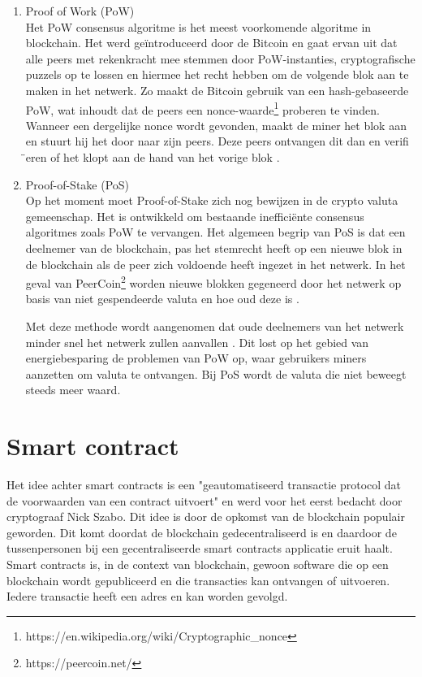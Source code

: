 \begin{enumerate}
	\item Proof of Work (PoW)\\
	Het PoW consensus algoritme is het meest voorkomende algoritme in blockchain. Het werd geïntroduceerd door de Bitcoin en gaat ervan uit dat alle peers met rekenkracht mee stemmen door PoW-instanties, cryptografische puzzels op te lossen en hiermee het recht hebben om de volgende blok aan te maken in het netwerk. Zo maakt de Bitcoin gebruik van een hash-gebaseerde PoW, wat inhoudt dat de peers een nonce-waarde\footnote{https://en.wikipedia.org/wiki/Cryptographic\_nonce} proberen te vinden. Wanneer een dergelijke nonce wordt gevonden, maakt de miner het blok aan en stuurt hij het door naar zijn peers. Deze peers ontvangen dit dan en verifi ̈eren of het klopt aan de hand van het vorige blok  \cite{securityPOW}.
	\item Proof-of-Stake (PoS)\\
Op het moment moet Proof-of-Stake zich nog bewijzen in de crypto valuta gemeenschap. Het is ontwikkeld om bestaande inefficiënte consensus algoritmes zoals PoW te vervangen. Het algemeen begrip van PoS is dat een deelnemer van de blockchain, pas het stemrecht heeft op een nieuwe blok in de blockchain als de peer zich voldoende heeft ingezet in het netwerk. In het geval van PeerCoin\footnote{https://peercoin.net/} worden nieuwe blokken gegeneerd door het netwerk op basis van niet gespendeerde valuta en hoe oud deze is \cite{posProtocol}.\par

Met deze methode wordt aangenomen dat oude deelnemers van het netwerk minder snel het netwerk zullen aanvallen \cite{blockchainIssuesAndChallenges}. Dit lost op het gebied van energiebesparing de problemen van PoW op, waar gebruikers miners aanzetten om valuta te ontvangen. Bij PoS wordt de valuta die niet beweegt steeds meer waard.
\end{enumerate}
\newpage

\section{Smart contract}
Het idee achter smart contracts is een "geautomatiseerd transactie protocol dat de voorwaarden van een contract uitvoert" \cite{smartContracts} en werd voor het eerst bedacht door cryptograaf Nick Szabo. Dit idee is door de opkomst van de blockchain populair geworden. Dit komt doordat de blockchain gedecentraliseerd is en daardoor de tussenpersonen bij een gecentraliseerde smart contracts applicatie eruit haalt. Smart contracts is, in de context van blockchain, gewoon software die op een blockchain wordt gepubliceerd en die transacties kan ontvangen of uitvoeren. Iedere transactie heeft een adres en kan worden gevolgd.\par